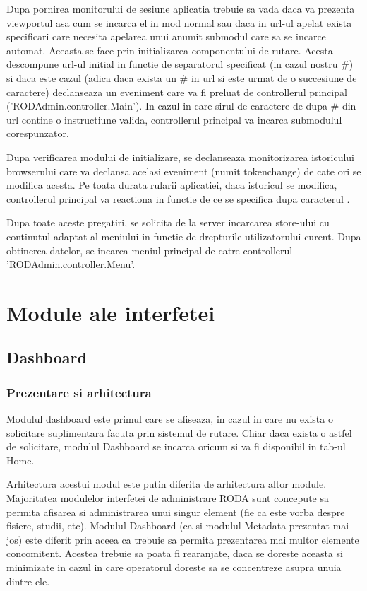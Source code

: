Dupa pornirea monitorului de sesiune aplicatia trebuie sa vada daca va prezenta viewportul asa cum se incarca el in mod normal sau daca in url-ul apelat exista specificari care necesita apelarea unui anumit submodul care sa se incarce automat. Aceasta se face prin initializarea componentului de rutare. Acesta descompune url-ul initial in functie de separatorul specificat (in cazul nostru \#) si daca este cazul (adica daca exista un \# in url si este urmat de o succesiune de caractere) declanseaza un eveniment care va fi preluat de controllerul principal ('RODAdmin.controller.Main'). In cazul in care sirul de caractere de dupa \# din url contine o instructiune valida, controllerul principal va incarca submodulul corespunzator. 

Dupa verificarea modului de initializare, se declanseaza monitorizarea istoricului browserului care va declansa acelasi eveniment (numit tokenchange) de cate ori se modifica acesta. Pe toata durata rularii aplicatiei, daca istoricul se modifica, controllerul principal va reactiona in functie de ce se specifica dupa caracterul . 

Dupa toate aceste pregatiri, se solicita de la server incarcarea store-ului cu continutul adaptat al meniului in functie de drepturile utilizatorului curent. Dupa obtinerea datelor, se incarca meniul principal de catre controllerul 'RODAdmin.controller.Menu'. 

\section{Module ale interfetei}

\subsection{Dashboard}

\subsubsection{Prezentare si arhitectura}

Modulul dashboard este primul care se afiseaza, in cazul in care nu exista o solicitare suplimentara facuta prin sistemul de rutare. Chiar daca exista o astfel de solicitare, modulul Dashboard se incarca oricum si va fi disponibil in tab-ul Home.

Arhitectura acestui modul este putin diferita de arhitectura altor module. Majoritatea modulelor interfetei de administrare RODA sunt concepute sa permita afisarea si administrarea unui singur element (fie ca este vorba despre fisiere, studii, etc). Modulul Dashboard (ca si modulul Metadata prezentat mai jos) este diferit prin aceea ca trebuie sa permita prezentarea mai multor elemente concomitent. Acestea trebuie sa poata fi rearanjate, daca se doreste aceasta si minimizate in cazul in care operatorul doreste sa se concentreze asupra unuia dintre ele. 

